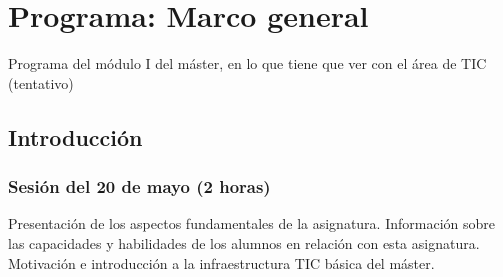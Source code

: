 \documentclass[a4paper,12pt]{article}
\begin{document}



\section{Programa: Marco general}

Programa del módulo I del máster, en lo que tiene que ver con el área de TIC (tentativo)

\subsection{Introducción}

\subsubsection{Sesión del 20 de mayo (2 horas)}

Presentación de los aspectos fundamentales de la asignatura. Información sobre las capacidades y habilidades de los alumnos en relación con esta asignatura. Motivación e introducción a la infraestructura TIC básica del máster.
\end{document}
